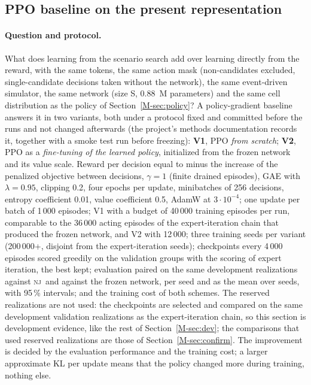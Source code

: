 \documentclass[11pt,a4paper]{article}
\theoremstyle{plain}
\theoremstyle{definition}
\theoremstyle{remark}
\newcommand{\nj}{\textsc{nj}}
\begin{document}
\subsection{PPO baseline on the present representation}\label{sec:ppo}
\paragraph{Question and protocol.}
What does learning from the scenario search add over learning directly from the reward,
with the same tokens, the same action mask (non-candidates excluded, single-candidate
decisions taken without the network), the same event-driven simulator, the same network
(size S, 0.88~M parameters) and the same cell distribution as the policy of
Section~\ref{M-sec:policy}? A policy-gradient baseline \cite{Schulman2017} answers it in
two variants, both under a protocol fixed and committed before the runs and not changed
afterwards (the project's methods documentation records it, together with a smoke test
run before freezing): \textbf{V1}, PPO \emph{from scratch}; \textbf{V2}, PPO as a
\emph{fine-tuning of the learned policy}, initialized from the frozen network and its
value scale. Reward per decision equal to minus the increase of the penalized objective
between decisions, $\gamma=1$ (finite drained episodes), GAE with $\lambda=0.95$,
clipping 0.2, four epochs per update, minibatches of 256 decisions, entropy coefficient
0.01, value coefficient 0.5, AdamW at $3\cdot10^{-4}$; one update per batch of 1\,000
episodes; V1 with a budget of 40\,000 training episodes per run, comparable to the
36\,000 acting episodes of the expert-iteration chain that produced the frozen network,
and V2 with 12\,000; three training seeds per variant (200\,000+, disjoint from the
expert-iteration seeds); checkpoints every 4\,000 episodes scored greedily on the
validation groups with the scoring of expert iteration, the best kept; evaluation paired
on the same development realizations against \nj\ and against the frozen network, per
seed and as the mean over seeds, with 95\,\% intervals; and the training cost of both
schemes. The reserved realizations are not used: the checkpoints are selected and compared on
the same development validation realizations as the expert-iteration chain, so this
section is development evidence, like the rest of Section~\ref{M-sec:dev}; the
comparisons that used reserved realizations are those of Section~\ref{M-sec:confirm}. The
improvement is decided by the evaluation performance and the training cost; a larger
approximate KL per update means that the policy changed more during training, nothing
else.
\end{document}
